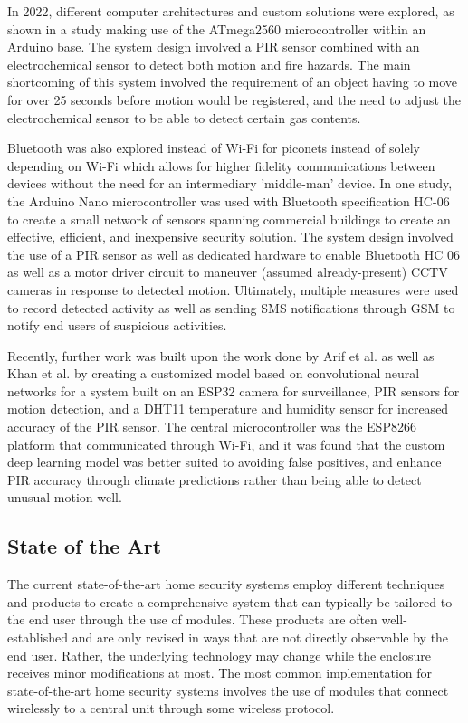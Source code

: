 In 2022, different computer architectures and custom solutions were explored,
as shown in a study making use of the ATmega2560 microcontroller within an Arduino base. The
system design involved a PIR sensor combined with an electrochemical sensor to detect both
motion and fire hazards. The main shortcoming of this system involved the requirement of an
object having to move for over 25 seconds before motion would be registered, and the need to
adjust the electrochemical sensor to be able to detect certain gas contents.
\cite{rhizmaSuhendar2022}

Bluetooth was also explored instead of Wi-Fi for piconets instead of solely depending on
Wi-Fi which allows for higher fidelity communications between devices without the need for an
intermediary 'middle-man' device. In one study, the Arduino Nano microcontroller was used
with Bluetooth specification HC-06 to create a small network of sensors spanning commercial
buildings to create an effective, efficient, and inexpensive security solution. The system
design involved the use of a PIR sensor as well as dedicated hardware to enable Bluetooth HC
06 as well as a motor driver circuit to maneuver (assumed already-present) CCTV cameras in
response to detected motion. Ultimately, multiple measures were used to record detected
activity as well as sending SMS notifications through GSM to notify end users of suspicious
activities. \cite{HameedEtAl2022}

Recently, further work was built upon the work done by Arif et al. as well as Khan et al. by
creating a customized model based on convolutional neural networks for a system built on an
ESP32 camera for surveillance, PIR sensors for motion detection, and a DHT11 temperature and
humidity sensor for increased accuracy of the PIR sensor. The central microcontroller was the
ESP8266 platform that communicated through Wi-Fi, and it was found that the custom deep
learning model was better suited to avoiding false positives, and enhance PIR accuracy
through climate predictions rather than being able to detect unusual motion well.
\cite{TaiwoEtAl2022}

\subsection{State of the Art}\label{subsec:state-of-the-art}

The current state-of-the-art home security systems employ different techniques and products
to create a comprehensive system that can typically be tailored to the end user through the
use of modules. These products are often well-established and are only revised in ways that
are not directly observable by the end user. Rather, the underlying technology may change
while the enclosure receives minor modifications at most. \cite{sarhan2020} The most common
implementation for state-of-the-art home security systems involves the use of modules that
connect wirelessly to a central unit through some wireless protocol. \cite{joseMalekian2017} \cite{chowdhuryAhmed2021} \cite{WahyuniEtAl2021} \cite{rhizmaSuhendar2022} \cite{HameedEtAl2022}

